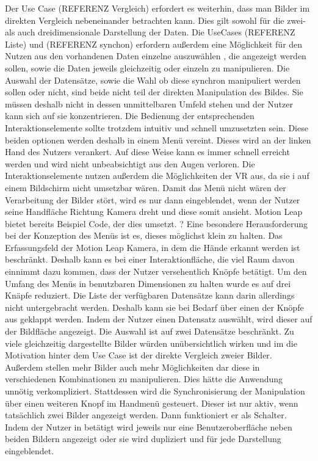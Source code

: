 Der Use Case (REFERENZ Vergleich) erfordert es weiterhin, dass man Bilder im direkten Vergleich nebeneinander betrachten kann. Dies gilt sowohl für die zwei- als auch dreidimensionale Darstellung der Daten. Die UseCases (REFERENZ Liste) und (REFERENZ synchon) erfordern außerdem eine Möglichkeit für den Nutzen aus den vorhandenen Daten einzelne auszuwählen , die angezeigt werden sollen, sowie die Daten jeweils gleichzeitig oder einzeln zu manipulieren. 
Die Auswahl der Datensätze, sowie die Wahl ob diese synchron manipuliert werden sollen oder nicht, sind beide nicht teil der direkten Manipulation des Bildes. Sie müssen deshalb nicht in dessen unmittelbaren Umfeld stehen und der Nutzer kann sich auf sie konzentrieren. 
Die Bedienung der entsprechenden Interaktionselemente sollte trotzdem intuitiv und schnell umzusetzten sein. 
Diese beiden optionen werden deshalb in einem Menü vereint. Dieses wird an der linken Hand des Nutzers verankert. Auf diese Weise kann es immer schnell erreicht werden und wird nicht unbeabsichtigt aus den Augen verloren. Die Interaktionselemente nutzen außerdem die Möglichkeiten der VR aus, da sie i auf einem Bildschirm nicht umsetzbar wären. 
Damit das Menü nicht wären der Verarbeitung der Bilder stört, wird es nur dann eingeblendet, wenn der Nutzer seine Handfläche Richtung Kamera dreht und diese somit ansieht. Motion Leap bietet bereits Beispiel Code, der dies umsetzt. ?
Eine besondere Herausforderung bei der Konzeption des Menüs ist es, dieses möglichst klein zu halten. Das Erfassungsfeld der Motion Leap Kamera, in dem die Hände erkannt werden ist beschränkt. Deshalb kann es bei einer Interaktionfläche, die viel Raum davon einnimmt dazu kommen, dass der Nutzer versehentlich Knöpfe betätigt. 
Um den Umfang des Menüs in benutzbaren Dimensionen zu halten wurde es auf drei Knäpfe reduziert. 
Die Liste der verfügbaren Datensätze kann darin allerdings nicht untergebracht werden. Deshalb kann sie bei Bedarf über einen der Knöpfe aus geklappt werden. 
Indem der Nutzer einen Datensatz auswählt, wird dieser auf der Bildfläche angezeigt. Die Auswahl ist auf zwei Datensätze beschränkt. Zu viele gleichzeitig dargestellte Bilder würden unübersichtlich wirken und im die Motivation hinter dem Use Case ist der direkte Vergleich zweier Bilder. Außerdem stellen mehr Bilder auch mehr Möglichkeiten dar diese in verschiedenen Kombinationen zu manipulieren. Dies hätte die Anwendung unnötig verkompliziert. 
Stattdessen wird die Synchronisierung der Manipulation über einen weiteren Knopf im Handmenü gesteuert. Dieser ist nur aktiv, wenn tatsächlich zwei Bilder angezeigt werden. Dann funktioniert er als Schalter. Indem der Nutzer in betätigt wird jeweils nur eine Benutzeroberfläche neben beiden Bildern angezeigt oder sie wird dupliziert und für jede Darstellung eingeblendet. 




